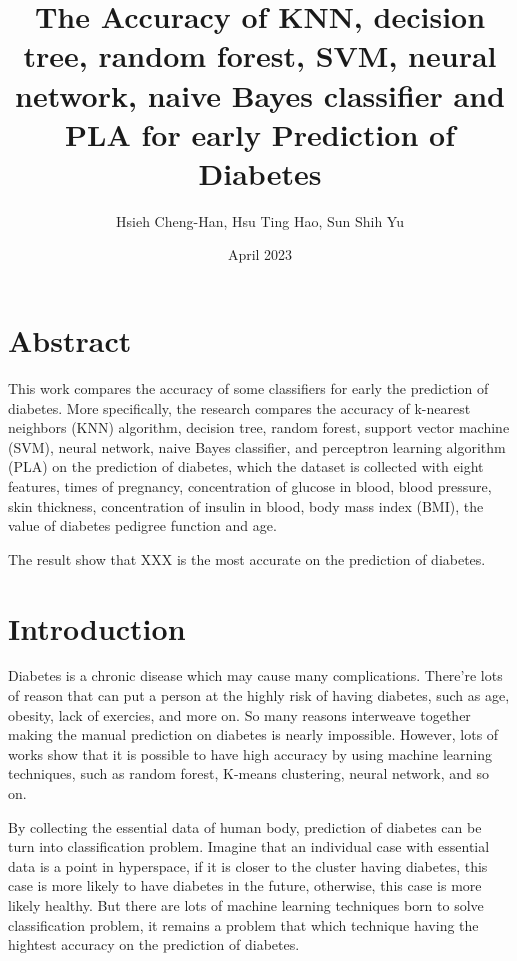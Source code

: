\documentclass[twocolumn,10pt]{article}
\begin{document}
\title{The Accuracy of KNN, decision tree, random forest, SVM, neural network, naive Bayes classifier and PLA for early Prediction of Diabetes}

\author{Hsieh Cheng-Han, Hsu Ting Hao, Sun Shih Yu}
\date{April 2023}
\maketitle

\section*{Abstract}
  This work compares the accuracy of some classifiers for early the prediction of diabetes. More specifically, 
  the research compares the accuracy of k-nearest neighbors (KNN) algorithm, decision tree, random forest, 
  support vector machine (SVM), neural network, naive Bayes classifier, and perceptron learning algorithm (PLA) on the prediction of diabetes, which 
  the dataset is collected with eight features, times of pregnancy, concentration of glucose in blood, blood 
  pressure, skin thickness,  concentration of insulin in blood, body mass index (BMI), the value of diabetes 
  pedigree function and age.

  The result show that XXX is the most accurate on the prediction of diabetes.

\section{Introduction}
\label{sec:Introduction}
  Diabetes is a chronic disease which may cause many complications. There're lots of reason that can put a person 
  at the highly risk of having diabetes, such as age, obesity, lack of exercies, and more on. So many reasons 
  interweave together making the manual prediction on diabetes is nearly impossible. However, lots of works \cite{MUJUMDAR2019292} \cite{MAHBOOBALAM2019100204} \cite{10.3389/fgene.2018.00515}
  show that it is possible to have high accuracy by using machine learning techniques, such as random forest, 
  K-means clustering, neural network, and so on. 

  By collecting the essential data of human body, prediction of diabetes can be turn into classification problem. 
  Imagine that an individual case with essential data is a point in hyperspace, if it is closer to the cluster
  having diabetes, this case is more likely to have diabetes in the future, otherwise, this case is more likely 
  healthy. But there are lots of machine learning techniques born to solve classification problem, it remains a 
  problem that which technique having the hightest accuracy on the prediction of diabetes. 
\end{document}
